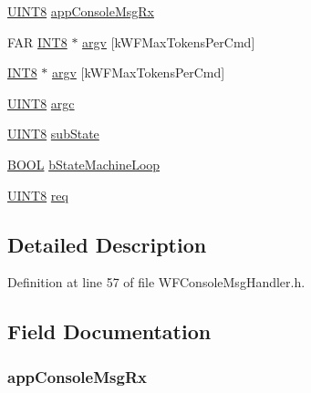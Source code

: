 \begin{DoxyCompactItemize}
\hyperlink{_generic_type_defs_8h_ab27e9918b538ce9d8ca692479b375b6a}{U\+I\+N\+T8} \hyperlink{structt_console_context_a10bebcc1cd5bbe7c422d53f3a4f20259}{app\+Console\+Msg\+Rx}
\item 
F\+A\+R \hyperlink{_generic_type_defs_8h_a7ebe70ceca856797319175e30bcf003d}{I\+N\+T8} $\ast$ \hyperlink{structt_console_context_a05ba4f6092dd3b82ef2ff4ce631434c1}{argv} \mbox{[}k\+W\+F\+Max\+Tokens\+Per\+Cmd\mbox{]}
\item 
\hyperlink{_generic_type_defs_8h_a7ebe70ceca856797319175e30bcf003d}{I\+N\+T8} $\ast$ \hyperlink{structt_console_context_ab20db0748e70ff77777cde949c76bb39}{argv} \mbox{[}k\+W\+F\+Max\+Tokens\+Per\+Cmd\mbox{]}
\item 
\hyperlink{_generic_type_defs_8h_ab27e9918b538ce9d8ca692479b375b6a}{U\+I\+N\+T8} \hyperlink{structt_console_context_a87ea22d9a6af781abe0e449b1814ed92}{argc}
\item 
\hyperlink{_generic_type_defs_8h_ab27e9918b538ce9d8ca692479b375b6a}{U\+I\+N\+T8} \hyperlink{structt_console_context_a6da82751f46dce9c0e0149b73a71cada}{sub\+State}
\item 
\hyperlink{_generic_type_defs_8h_a54d65c7fa62e62c9754371e42f5111b9}{B\+O\+O\+L} \hyperlink{structt_console_context_aa26da1cf710ba0e468ef70bdaaf04fab}{b\+State\+Machine\+Loop}
\item 
\hyperlink{_generic_type_defs_8h_ab27e9918b538ce9d8ca692479b375b6a}{U\+I\+N\+T8} \hyperlink{structt_console_context_ad3093f7cdd8076441d3f527dbc105c1c}{req}
\end{DoxyCompactItemize}


\subsection{Detailed Description}


Definition at line 57 of file W\+F\+Console\+Msg\+Handler.\+h.



\subsection{Field Documentation}
\hypertarget{structt_console_context_a10bebcc1cd5bbe7c422d53f3a4f20259}{}
\subsubsection[{app\+Console\+Msg\+Rx}]{ app\+Console\+Msg\+Rx}\label{structt_console_context_a10bebcc1cd5bbe7c422d53f3a4f20259}


